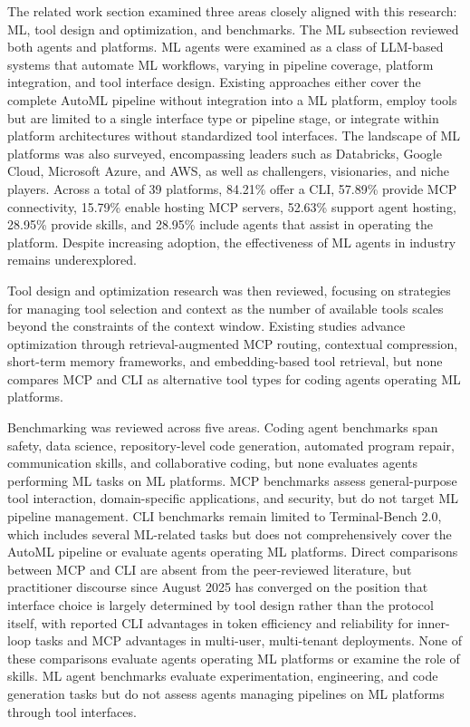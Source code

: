 \documentclass[
english,                 %
bibtex,                  %
includeExtraAbstracts, %
]{kththesis}
\numberwithin{listing}{chapter}
\begin{document}
The related work section examined three areas closely aligned with this research: \gls{ML}, tool design and optimization, and benchmarks. The \gls{ML} subsection reviewed both agents and platforms. \Gls{ML} agents were examined as a class of \gls{LLM}-based systems that automate \gls{ML} workflows, varying in pipeline coverage, platform integration, and tool interface design. Existing approaches either cover the complete \gls{AutoML} pipeline without integration into a \gls{ML} platform, employ tools but are limited to a single interface type or pipeline stage, or integrate within platform architectures without standardized tool interfaces. The landscape of \gls{ML} platforms was also surveyed, encompassing leaders such as Databricks, Google Cloud, Microsoft Azure, and \gls{AWS}, as well as challengers, visionaries, and niche players. Across a total of 39 platforms, 84.21\% offer a \gls{CLI}, 57.89\% provide \gls{MCP} connectivity, 15.79\% enable hosting \gls{MCP} servers, 52.63\% support agent hosting, 28.95\% provide skills, and 28.95\% include agents that assist in operating the platform. Despite increasing adoption, the effectiveness of \gls{ML} agents in industry remains underexplored.

Tool design and optimization research was then reviewed, focusing on strategies for managing tool selection and context as the number of available tools scales beyond the constraints of the context window. Existing studies advance optimization through retrieval-augmented \gls{MCP} routing, contextual compression, short-term memory frameworks, and embedding-based tool retrieval, but none compares \gls{MCP} and \gls{CLI} as alternative tool types for coding agents operating \gls{ML} platforms.

Benchmarking was reviewed across five areas. Coding agent benchmarks span safety, data science, repository-level code generation, automated program repair, communication skills, and collaborative coding, but none evaluates agents performing \gls{ML} tasks on \gls{ML} platforms. \Gls{MCP} benchmarks assess general-purpose tool interaction, domain-specific applications, and security, but do not target \gls{ML} pipeline management. \Gls{CLI} benchmarks remain limited to Terminal-Bench 2.0, which includes several \gls{ML}-related tasks but does not comprehensively cover the \gls{AutoML} pipeline or evaluate agents operating \gls{ML} platforms. Direct comparisons between \gls{MCP} and \gls{CLI} are absent from the peer-reviewed literature, but practitioner discourse since August 2025 has converged on the position that interface choice is largely determined by tool design rather than the protocol itself, with reported \gls{CLI} advantages in token efficiency and reliability for inner-loop tasks and \gls{MCP} advantages in multi-user, multi-tenant deployments. None of these comparisons evaluate agents operating \gls{ML} platforms or examine the role of skills. \Gls{ML} agent benchmarks evaluate experimentation, engineering, and code generation tasks but do not assess agents managing pipelines on \gls{ML} platforms through tool interfaces.
\end{document}
